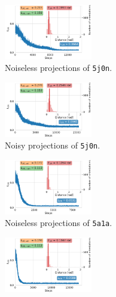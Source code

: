 \begin{figure}[t]
    \centering
    \begin{subfigure}[b]{0.26\linewidth}
        \centering
        \includegraphics[height=2.4cm]{figures/5j0n_fullcvg_uniformS2_noise0_ar_aa.pdf}
        \caption{Noiseless projections of \texttt{5j0n}.}%
        \label{fig:5j0n-noise0-orientation-recovery}
    \end{subfigure}
    \hfill
    \begin{subfigure}[b]{0.23\linewidth}
        \centering
        \includegraphics[height=2.4cm]{figures/5j0n_fullcvg_uniformS2_noise16_ar_aa.pdf}
        \caption{Noisy projections of \texttt{5j0n}.}%
        \label{fig:5j0n-noise16-orientation-recovery}
    \end{subfigure}
    \hfill
    \begin{subfigure}[b]{0.26\linewidth}
        \centering
        \includegraphics[height=2.4cm]{figures/5a1a_quartercov_uniformS2_noise0_LAST_ar_aa.pdf}
        \caption{Noiseless projections of \texttt{5a1a}.
        }%
        \label{fig:5a1a-noise0-orientation-recovery}
    \end{subfigure}
    \begin{subfigure}[b]{0.23\linewidth}
        \centering
        \includegraphics[height=2.4cm]{figures/5a1a_quartercov_uniformS2_noise16_LAST_ar_aa.pdf}

\end{subfigure}
\end{figure}
